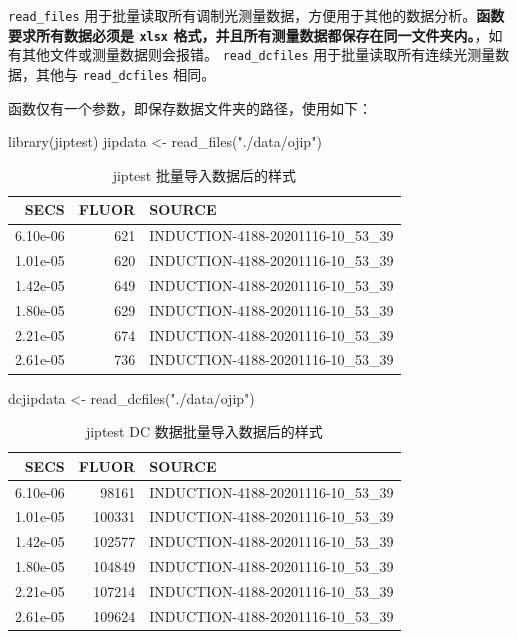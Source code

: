 \documentclass[
]{krantz}
\makeatletter
\newenvironment{Shaded}{\begin{snugshade}}{\end{snugshade}}
\newcommand{\FunctionTok}[1]{\textcolor[rgb]{0.00,0.00,0.00}{#1}}
\newcommand{\NormalTok}[1]{#1}
\newcommand{\OtherTok}[1]{\textcolor[rgb]{0.56,0.35,0.01}{#1}}
\newcommand{\StringTok}[1]{\textcolor[rgb]{0.31,0.60,0.02}{#1}}
\newenvironment{kframe}{%
\medskip{}
\setlength{\fboxsep}{.8em}
 \def\at@end@of@kframe{}%
 \ifinner\ifhmode%
  \def\at@end@of@kframe{\end{minipage}}%
  \begin{minipage}{\columnwidth}%
 \fi\fi%
 \def\FrameCommand##1{\hskip\@totalleftmargin \hskip-\fboxsep
 \colorbox{shadecolor}{##1}\hskip-\fboxsep
     \hskip-\linewidth \hskip-\@totalleftmargin \hskip\columnwidth}%
 \MakeFramed {\advance\hsize-\width
   \@totalleftmargin\z@ \linewidth\hsize
   \@setminipage}}%
 {\par\unskip\endMakeFramed%
 \at@end@of@kframe}
\renewenvironment{Shaded}{\begin{kframe}}{\end{kframe}}
\makeatother
\begin{document}
\texttt{read\_files} 用于批量读取所有调制光测量数据，方便用于其他的数据分析。\textbf{函数要求所有数据必须是 \texttt{xlsx} 格式，并且所有测量数据都保存在同一文件夹内。}，如有其他文件或测量数据则会报错。
\texttt{read\_dcfiles} 用于批量读取所有连续光测量数据，其他与 \texttt{read\_dcfiles} 相同。

函数仅有一个参数，即保存数据文件夹的路径，使用如下：

\begin{Shaded}
\begin{Highlighting}[]
\FunctionTok{library}\NormalTok{(jiptest)}
\NormalTok{jipdata }\OtherTok{\textless{}{-}} \FunctionTok{read\_files}\NormalTok{(}\StringTok{"./data/ojip"}\NormalTok{)}
\end{Highlighting}
\end{Shaded}

\begin{table}

\caption{\label{tab:unnamed-chunk-65}jiptest 批量导入数据后的样式}
\centering
\begin{tabular}[t]{rrl}
\toprule
SECS & FLUOR & SOURCE\\
\midrule
6.10e-06 & 621 & INDUCTION-4188-20201116-10\_53\_39\\
1.01e-05 & 620 & INDUCTION-4188-20201116-10\_53\_39\\
1.42e-05 & 649 & INDUCTION-4188-20201116-10\_53\_39\\
1.80e-05 & 629 & INDUCTION-4188-20201116-10\_53\_39\\
2.21e-05 & 674 & INDUCTION-4188-20201116-10\_53\_39\\
\addlinespace
2.61e-05 & 736 & INDUCTION-4188-20201116-10\_53\_39\\
\bottomrule
\end{tabular}
\end{table}

\begin{Shaded}
\begin{Highlighting}[]
\NormalTok{dcjipdata }\OtherTok{\textless{}{-}} \FunctionTok{read\_dcfiles}\NormalTok{(}\StringTok{"./data/ojip"}\NormalTok{)}
\end{Highlighting}
\end{Shaded}

\begin{table}

\caption{\label{tab:unnamed-chunk-66}jiptest DC 数据批量导入数据后的样式}
\centering
\begin{tabular}[t]{rrl}
\toprule
SECS & FLUOR & SOURCE\\
\midrule
6.10e-06 & 98161 & INDUCTION-4188-20201116-10\_53\_39\\
1.01e-05 & 100331 & INDUCTION-4188-20201116-10\_53\_39\\
1.42e-05 & 102577 & INDUCTION-4188-20201116-10\_53\_39\\
1.80e-05 & 104849 & INDUCTION-4188-20201116-10\_53\_39\\
2.21e-05 & 107214 & INDUCTION-4188-20201116-10\_53\_39\\
\addlinespace
2.61e-05 & 109624 & INDUCTION-4188-20201116-10\_53\_39\\
\bottomrule
\end{tabular}
\end{table}
\end{document}
